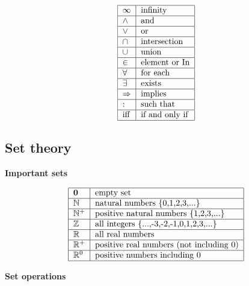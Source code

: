 \documentclass[justified,sixbynine]{tufte-book}
\def\subsubsection#1{{\bf #1}}
\theoremstyle{plain}%
\theoremstyle{definition}
\theoremstyle{remark}
\begin{document}
\begin{fullwidth}
\begin{equation}
\begin{tabular}{|l|l|}
\hline
$\infty $ & infinity \\ \hline
$\wedge $ & and \\ \hline
$\vee $ & or \\ \hline
$\cap $ & intersection \\ \hline
$\cup $ & union \\ \hline
$\in $ & element or In \\ \hline
$\forall $ & for each \\ \hline
$\exists $ & exists \\ \hline
$\Rightarrow $ & implies \\ \hline
: & such that \\ \hline
iff & if and only if \\ \hline
\end{tabular}
\end{equation}

\goodbreak\subsection{Set theory}

\subsubsection{Important sets}

\begin{equation}
\begin{tabular}{|l|l|}
\hline
${\bf 0}$ & empty set \\ \hline
${\Bbb N}$ & natural numbers \{0,1,2,3,...\} \\ \hline
${\Bbb N}^{+}$ & positive natural numbers \{1,2,3,...\} \\ \hline
${\Bbb Z}$ & all integers \{...,-3,-2,-1,0,1,2,3,...\} \\ \hline
${\Bbb R}$ & all real numbers \\ \hline
${\Bbb R}^{+}$ & positive real numbers (not including 0) \\ \hline
${\Bbb R}^{0}$ & positive numbers including 0 \\ \hline
\end{tabular}
\end{equation}

\subsubsection{Set operations}


\end{fullwidth}
\end{document}
